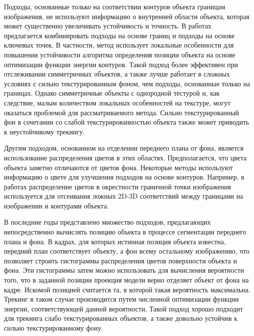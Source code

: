 Подходы, основанные только на соответствии контуров объекта границам
изображения, не используют информацию о внутренней области объекта, которая
может существенно увеличивать устойчивость и точность.
В работах \cite{VacchettiEdges2004,ChoiFeaturesAndEdges,Bugaev_2018_ECCV}
предлагается комбинировать подходы на основе границ и подходы на основе
ключевых точек.
В частности, метод \cite{Bugaev_2018_ECCV} использует локальные особенности для
повышения устойчивости алгоритма определения позиции объекта на основе
оптимизации функции энергии контуров.
Такой подход более эффективен при отслеживании симметричных объектов, а также
лучше работает в сложных условиях с сильно текстурированным фоном, чем подходы,
основанные только на границах.
Однако симметричные объекты с однородной тестурой и, как следствие, малым
количеством локальных особенностей на текстуре, могут оказаться проблемой для
рассматриваемого метода.
Сильно текстурированный фон в сочетании со слабой текстурированностью
объекта также может приводить к неустойчивому трекингу.

Другим подходом, основанном на отделении переднего плана от фона, является
использование распределения цветов в этих областях.
Предполагается, что цвета объекта заметно отличаются от цветов фона.
Некоторые методы \cite{SeoHinterstoisser2014,WangZhong2015,Zhong2018}
используют информацию о цвете для улучшения подходов на основе контуров.
Например, в работах \cite{SeoHinterstoisser2014,WangZhong2015} распределение
цветов в окрестности граничной точки изображения используется для отсеивания
ложных 2D-3D соответствий между границами на изображении и контурами объекта.

В последние годы представлено множество подходов, предлагающих непосредственно
вычислять позицию объекта в процессе сегментации переднего плана и фона.
В кадрах, для которых истинная позиция объекта известна, передний план
соответствует объекту, а фон всему остальному изображению, что позволяет
строить гистограммы распределения цветов поверхности объекта и фона.
Эти гистограммы затем можно использовать для вычисления вероятности того, что в
заданной позиции проекция модели верно отделяет объект от фона на кадре.
Искомой позицией считается та, в которой такая вероятность максимальна.
Трекинг в таком случае производится путем численной оптимизации функции
энергии, соответствующей данной вероятности.
Такой подход хорошо подходит для трекинга слабо текстурированных объектов, а
также довольно устойчив к сильно текстурированному фону.

